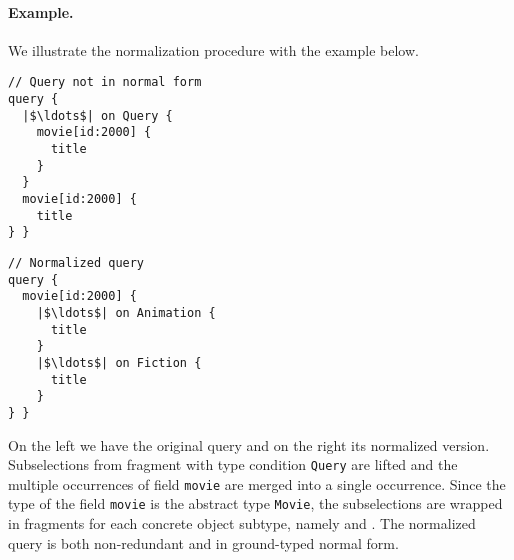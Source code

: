 \paragraph{Example.}  We illustrate the normalization procedure with
the example below.

\smallskip

\begin{minipage}[t]{.25\textwidth}
\begin{verbatim}
// Query not in normal form
query {
  |$\ldots$| on Query {
    movie[id:2000] {
      title
    }
  }
  movie[id:2000] {
    title
} }
\end{verbatim}
\end{minipage}%
\begin{minipage}[t]{.25\textwidth}
\begin{verbatim}
// Normalized query
query {
  movie[id:2000] {
    |$\ldots$| on Animation {
      title
    }
    |$\ldots$| on Fiction {
      title
    }
} }
\end{verbatim} 
\end{minipage}

\medskip

\noindent On the left we have the original query and on the right its normalized
version. Subselections from fragment with type condition \texttt{Query} are lifted and the multiple occurrences of field \texttt{movie} are merged into a single occurrence. 
Since the type of the field \texttt{movie} is the abstract type \texttt{Movie}, the subselections are wrapped in fragments for each concrete object subtype, namely \animation and \fiction. The normalized query is both non-redundant and in ground-typed normal form. 




\iffalse
\begin{minipage}[t]{.25\textwidth}
\begin{verbatim}
// Redundant query
query {
    goodboi {
        name
    }
    goodboi { 
 	name
    } 
}
\end{verbatim}
\end{minipage}%
\begin{minipage}[t]{.25\textwidth}
\begin{verbatim}

// Normalized query
query {
    goodboi {
        |$\ldots$| on Dog {
	    name
	}
	|$\ldots$| on Pig {
	    name
	}
    }	
}
\end{verbatim} 
\end{minipage}
\fi

